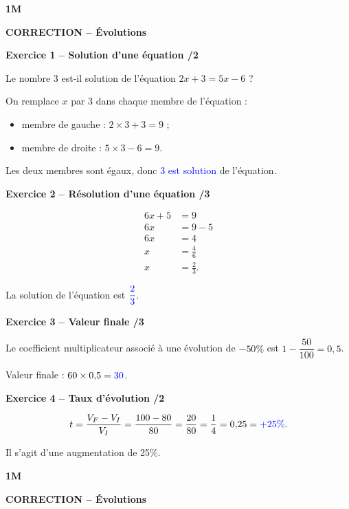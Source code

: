\documentclass[10pt,a4paper]{article}
\renewcommand{\niveau}{1M}
\renewcommand{\chapitre}{Évolutions}
\renewcommand{\interroversion}[1]{
    \noindent\textbf{\niveau}

    \vspace{-0.5cm}
    \begin{center}
        \textbf{\large CORRECTION -- \chapitre}
    \end{center}

    \vspace{0.1cm}
}
\begin{document}

\interroversion{A}

\textbf{Exercice 1 -- Solution d'une équation \hfill /2}

Le nombre \(3\) est-il solution de l'équation \(2x+3=5x-6\) ?

On remplace \(x\) par \(3\) dans chaque membre de l'équation :
\begin{itemize}
\item membre de gauche : \(2\times3+3=9\) ;
\item membre de droite : \(5\times3-6=9\).
\end{itemize}
Les deux membres sont égaux, donc \textcolor{blue}{\(3\) est solution} de l'équation.

\textbf{Exercice 2 -- Résolution d'une équation \hfill /3}

\[
\begin{aligned}
6x+5&=9\\
6x&=9-5\\
6x&=4\\
x&=\frac{4}{6}\\
x&=\frac{2}{3}.
\end{aligned}
\]

La solution de l'équation est \(\textcolor{blue}{\dfrac{2}{3}}\).

\textbf{Exercice 3 -- Valeur finale \hfill /3}

Le coefficient multiplicateur associé à une évolution de \(-50\%\) est \(1-\dfrac{50}{100}=0{,}5\).

Valeur finale : \(60\times0{,}5=\textcolor{blue}{30}\).


\textbf{Exercice 4 -- Taux d'évolution \hfill /2}

\[
t=\frac{V_F-V_I}{V_I}=\frac{100-80}{80}=\frac{20}{80}=\frac{1}{4}=0{,}25=\textcolor{blue}{+25\%}.
\]

Il s'agit d'une augmentation de 25\%.


\newpage


\interroversion{B}
\end{document}
